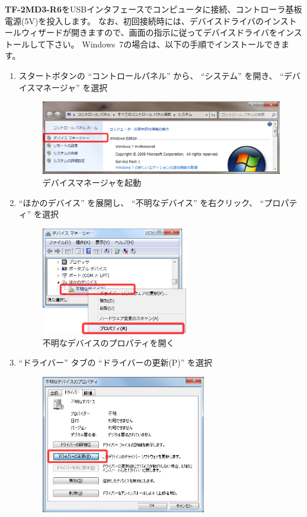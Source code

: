\documentclass[11pt,a4j,openany]{jbook}
\begin{document}
{\bf TF-2MD3-R6}をUSBインタフェースでコンピュータに接続、コントローラ基板電源(5V)を投入します。
なお、初回接続時には、デバイスドライバのインストールウィザードが開きますので、画面の指示に従ってデバイスドライバをインストールして下さい。
Windows~7の場合は、以下の手順でインストールできます。
\begin{enumerate}
	\item スタートボタンの ``コントロールパネル'' から、 ``システム'' を開き、 ``デバイスマネージャ'' を選択
		\begin{figure}[H]
			\centering\includegraphics[width=122mm]{windriver-install.3.system.eps}
			\caption{デバイスマネージャを起動}
			\label{fig:windriver.system}
		\end{figure}
	\item ``ほかのデバイス'' を展開し、 ``不明なデバイス'' を右クリック、 ``プロパティ'' を選択
		\begin{figure}[H]
			\centering\includegraphics[width=64mm]{windriver-install.4.device_man.eps}
			\caption{不明なデバイスのプロパティを開く}
			\label{fig:windriver.device_man}
		\end{figure}
	\item ``ドライバー'' タブの ``ドライバーの更新(P)'' を選択
		\begin{figure}[H]
			\centering\includegraphics[width=72mm]{windriver-install.5.device_prop.eps}

\end{figure}
\end{enumerate}
\end{document}
